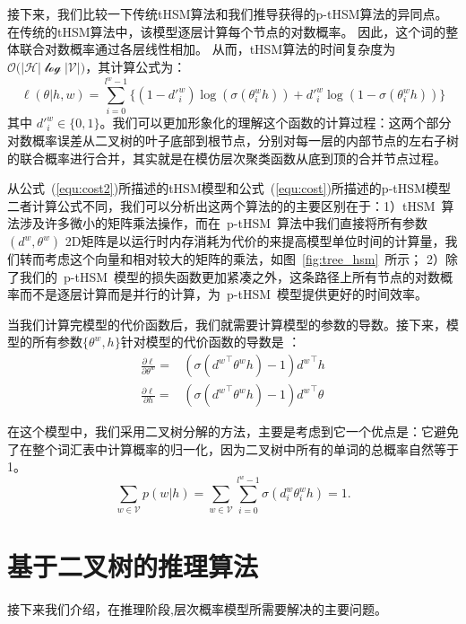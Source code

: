 接下来，我们比较一下传统tHSM算法和我们推导获得的p-tHSM算法的异同点。在传统的tHSM算法中，该模型逐层计算每个节点的对数概率。 因此，这个词的整体联合对数概率通过各层线性相加。 从而，tHSM算法的时间复杂度为$\mathcal{O(|H|\log|V|})$，其计算公式为：
\begin{equation}\label{equ:cost2}
\ell(\theta|h,w) =\sum_{i=0}^{l^w-1} \{(1-d'^w_i)\log (\sigma(\theta_{i}^w h))  + {d'^w_i}\log (1-\sigma (\theta_{i}^w h))\}
\end{equation}
其中 $d'^w_i\in \{0,1\}$。我们可以更加形象化的理解这个函数的计算过程：这两个部分对数概率误差从二叉树的叶子底部到根节点，分别对每一层的内部节点的左右子树的联合概率进行合并，其实就是在模仿层次聚类函数从底到顶的合并节点过程。

从公式~(\ref{equ:cost2})所描述的tHSM模型和公式~(\ref{equ:cost})所描述的p-tHSM模型二者计算公式不同，我们可以分析出这两个算法的的主要区别在于：1）tHSM~算法涉及许多微小的矩阵乘法操作，而在~p-tHSM~算法中我们直接将所有参数$(d^w,\theta^w)$ 2D矩阵是以运行时内存消耗为代价的来提高模型单位时间的计算量，我们转而考虑这个向量和相对较大的矩阵的乘法，如图~\ref{fig:tree_hsm}~所示； 2）除了我们的~p-tHSM~模型的损失函数更加紧凑之外，这条路径上所有节点的对数概率而不是逐层计算而是并行的计算，为~p-tHSM~模型提供更好的时间效率。

当我们计算完模型的代价函数后，我们就需要计算模型的参数的导数。接下来，模型的所有参数$\{\theta^w,h\}$针对模型的代价函数的导数是 ：
\begin{equation}
\begin{split}
\frac{\partial \ell}{\partial \theta^w}=&(\sigma({d^w}^\top\theta^w h) -1){d^w}^\top h \\
\frac{\partial \ell}{\partial h}=&(\sigma({d^w}^\top \theta^w h) -1){d^w}^\top \theta
\end{split}
\end{equation}


在这个模型中，我们采用二叉树分解的方法，主要是考虑到它一个优点是：它避免了在整个词汇表中计算概率的归一化，因为二叉树中所有的单词的总概率自然等于1。
\begin{equation}
\sum_{w\in \mathcal{V}}{p(w|h)}=\sum_{w \in \mathcal{V}}\sum_{i=0}^{l^w-1}{\sigma(d_i^w\theta_{i}^w h)}=1.
\end{equation}



\section{基于二叉树的推理算法}
接下来我们介绍，在推理阶段,层次概率模型所需要解决的主要问题。
